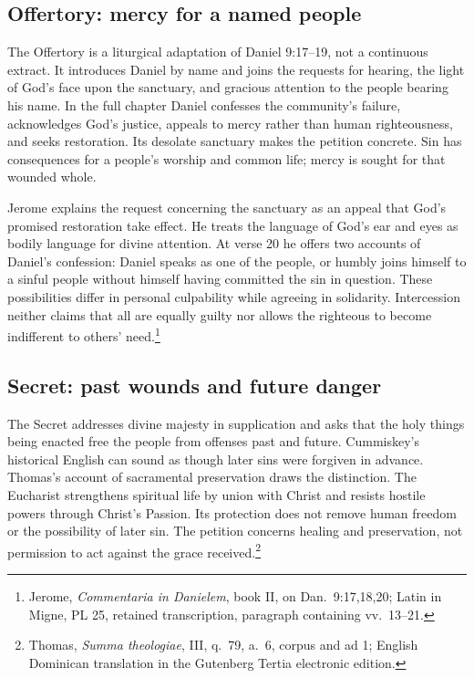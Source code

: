 \subsection{Offertory: mercy for a named people}
The Offertory is a liturgical adaptation of Daniel 9:17--19, not a continuous extract. It introduces Daniel by name and joins the requests for hearing, the light of God's face upon the sanctuary, and gracious attention to the people bearing his name. In the full chapter Daniel confesses the community's failure, acknowledges God's justice, appeals to mercy rather than human righteousness, and seeks restoration. Its desolate sanctuary makes the petition concrete. Sin has consequences for a people's worship and common life; mercy is sought for that wounded whole.

Jerome explains the request concerning the sanctuary as an appeal that God's promised restoration take effect. He treats the language of God's ear and eyes as bodily language for divine attention. At verse 20 he offers two accounts of Daniel's confession: Daniel speaks as one of the people, or humbly joins himself to a sinful people without himself having committed the sin in question. These possibilities differ in personal culpability while agreeing in solidarity. Intercession neither claims that all are equally guilty nor allows the righteous to become indifferent to others' need.\footnote{Jerome, \textit{Commentaria in Danielem}, book II, on Dan.~9:17,18,20; Latin in Migne, PL 25, retained transcription, paragraph containing vv.~13--21.}

\subsection{Secret: past wounds and future danger}
The Secret addresses divine majesty in supplication and asks that the holy things being enacted free the people from offenses past and future. Cummiskey's historical English can sound as though later sins were forgiven in advance. Thomas's account of sacramental preservation draws the distinction. The Eucharist strengthens spiritual life by union with Christ and resists hostile powers through Christ's Passion. Its protection does not remove human freedom or the possibility of later sin. The petition concerns healing and preservation, not permission to act against the grace received.\footnote{Thomas, \textit{Summa theologiae}, III, q.~79, a.~6, corpus and ad 1; English Dominican translation in the Gutenberg Tertia electronic edition.}

